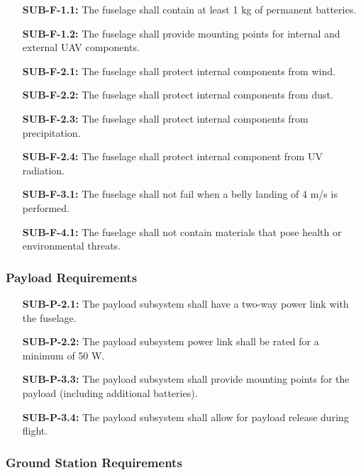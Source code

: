 \begin{enumerate}[leftmargin =3.5cm, align=parleft, labelwidth=8em]
    \item[\textbf{SUB-F-1.1:}] The fuselage shall contain at least 1 kg of permanent batteries. 
    \item[\textbf{SUB-F-1.2:}] The fuselage shall provide mounting points for internal and external UAV components.
    \item[\textbf{SUB-F-2.1:}] The fuselage shall protect internal components from wind.
    \item[\textbf{SUB-F-2.2:}] The fuselage shall protect internal components from dust.
    \item[\textbf{SUB-F-2.3:}] The fuselage shall protect internal components from precipitation.
    \item[\textbf{SUB-F-2.4:}] The fuselage shall protect internal component from UV radiation.
    \item[\textbf{SUB-F-3.1:}] The fuselage shall not fail when a belly landing of 4 m/s is performed.
    \item[\textbf{SUB-F-4.1:}] The fuselage shall not contain materials that pose health or environmental threats.
\end{enumerate}

\subsubsection{Payload Requirements}

\begin{enumerate}[leftmargin =3.5cm, align=parleft, labelwidth=8em]
    \item[\textbf{SUB-P-2.1:}] The payload subsystem shall have a two-way power link with the fuselage.
    \item[\textbf{SUB-P-2.2:}] The payload subsystem power link shall be rated for a minimum of 50 W.
    \item[\textbf{SUB-P-3.3:}] The payload subsystem shall provide mounting points for the payload (including additional batteries).
    \item[\textbf{SUB-P-3.4:}] The payload subsystem shall allow for payload release during flight.
\end{enumerate}

\subsubsection{Ground Station Requirements}


